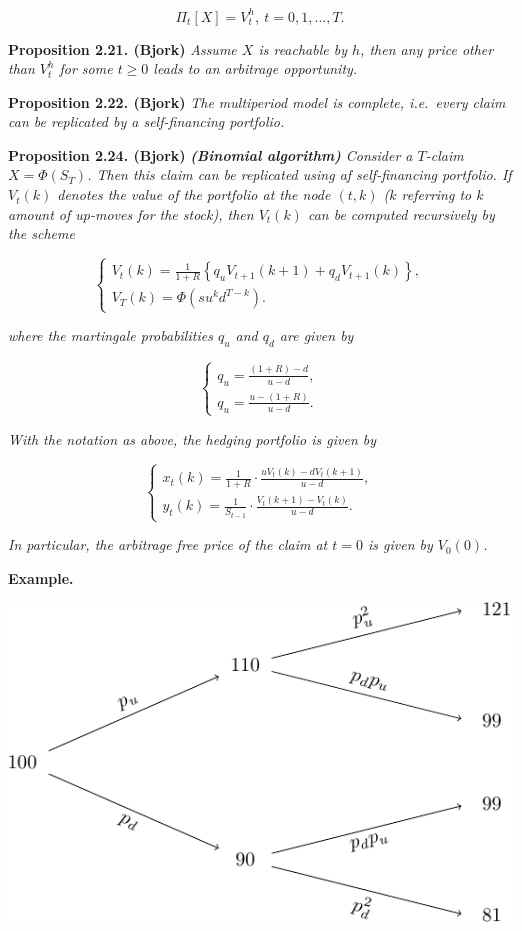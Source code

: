 \documentclass[a4paper,12pt,openany]{book}
\begin{document}
\[
\Pi_t[X]=V_t^h,\ t=0,1,...,T.
\]

\textbf{Proposition 2.21. (Bjork)} \emph{Assume \(X\) is reachable by \(h\), then any price other than \(V_t^h\) for some \(t\ge 0\) leads to an arbitrage opportunity.}

\textbf{Proposition 2.22. (Bjork)} \emph{The multiperiod model is complete, i.e.~every claim can be replicated by a self-financing portfolio.}

\textbf{Proposition 2.24. (Bjork)} \emph{\textbf{(Binomial algorithm)} Consider a \(T\)-claim \(X=\Phi(S_T)\). Then this claim can be replicated using af self-financing portfolio. If \(V_t(k)\) denotes the value of the portfolio at the node \((t,k)\) (\(k\) referring to \(k\) amount of up-moves for the stock), then \(V_t(k)\) can be computed recursively by the scheme}

\[
\left\{\begin{matrix}V_t(k)=\frac{1}{1+R}\left\{q_uV_{t+1}(k+1)+q_dV_{t+1}(k)\right\},\\ V_T(k)=\Phi(su^kd^{T-k}).\end{matrix}\right.
\]

\emph{where the martingale probabilities \(q_u\) and \(q_d\) are given by}

\[
\left\{\begin{matrix}q_u=\frac{(1+R)-d}{u-d},\\ q_u=\frac{u-(1+R)}{u-d}.\end{matrix}\right.
\]

\emph{With the notation as above, the hedging portfolio is given by}

\[
\left\{\begin{matrix}x_t(k)=\frac{1}{1+R}\cdot\frac{uV_t(k)-dV_t(k+1)}{u-d},\\ y_t(k)=\frac{1}{S_{t-1}}\cdot\frac{V_t(k+1)-V_t(k)}{u-d}.\end{matrix}\right.
\]

\emph{In particular, the arbitrage free price of the claim at \(t=0\) is given by \(V_0(0)\).}

\textbf{Example.}

\begin{center}\includegraphics[width=0.75\linewidth]{theory_files/figure-latex/unnamed-chunk-1-1} \end{center}
\end{document}
